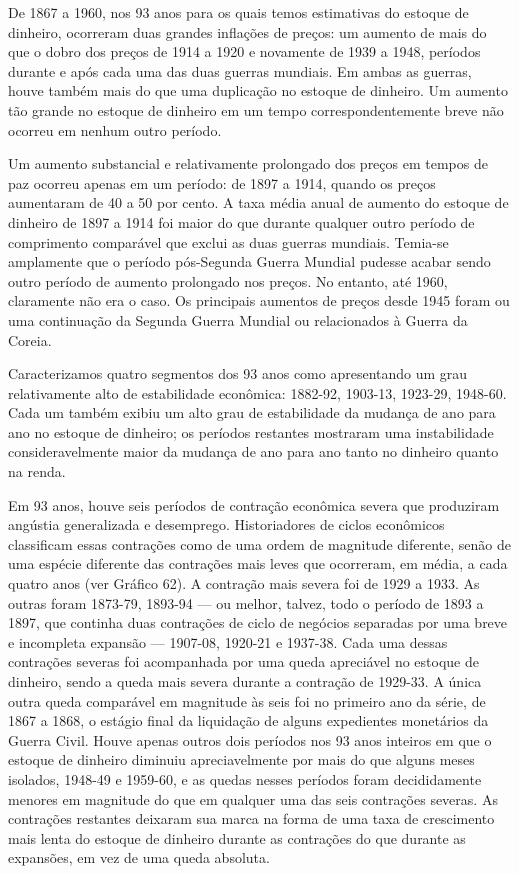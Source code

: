 \documentclass[12pt]{article}
\begin{document}
De 1867 a 1960, nos 93 anos para os quais temos estimativas do estoque de dinheiro, ocorreram duas grandes inflações de preços: um aumento de mais do que o dobro dos preços de 1914 a 1920 e novamente de 1939 a 1948, períodos durante e após cada uma das duas guerras mundiais. Em ambas as guerras, houve também mais do que uma duplicação no estoque de dinheiro. Um aumento tão grande no estoque de dinheiro em um tempo correspondentemente breve não ocorreu em nenhum outro período.

Um aumento substancial e relativamente prolongado dos preços em tempos de paz ocorreu apenas em um período: de 1897 a 1914, quando os preços aumentaram de 40 a 50 por cento. A taxa média anual de aumento do estoque de dinheiro de 1897 a 1914 foi maior do que durante qualquer outro período de comprimento comparável que exclui as duas guerras mundiais. Temia-se amplamente que o período pós-Segunda Guerra Mundial pudesse acabar sendo outro período de aumento prolongado nos preços. No entanto, até 1960, claramente não era o caso. Os principais aumentos de preços desde 1945 foram ou uma continuação da Segunda Guerra Mundial ou relacionados à Guerra da Coreia.

Caracterizamos quatro segmentos dos 93 anos como apresentando um grau relativamente alto de estabilidade econômica: 1882-92, 1903-13, 1923-29, 1948-60. Cada um também exibiu um alto grau de estabilidade da mudança de ano para ano no estoque de dinheiro; os períodos restantes mostraram uma instabilidade consideravelmente maior da mudança de ano para ano tanto no dinheiro quanto na renda.

Em 93 anos, houve seis períodos de contração econômica severa que produziram angústia generalizada e desemprego. Historiadores de ciclos econômicos classificam essas contrações como de uma ordem de magnitude diferente, senão de uma espécie diferente das contrações mais leves que ocorreram, em média, a cada quatro anos (ver Gráfico 62). A contração mais severa foi de 1929 a 1933. As outras foram 1873-79, 1893-94 — ou melhor, talvez, todo o período de 1893 a 1897, que continha duas contrações de ciclo de negócios separadas por uma breve e incompleta expansão — 1907-08, 1920-21 e 1937-38. Cada uma dessas contrações severas foi acompanhada por uma queda apreciável no estoque de dinheiro, sendo a queda mais severa durante a contração de 1929-33. A única outra queda comparável em magnitude às seis foi no primeiro ano da série, de 1867 a 1868, o estágio final da liquidação de alguns expedientes monetários da Guerra Civil. Houve apenas outros dois períodos nos 93 anos inteiros em que o estoque de dinheiro diminuiu apreciavelmente por mais do que alguns meses isolados, 1948-49 e 1959-60, e as quedas nesses períodos foram decididamente menores em magnitude do que em qualquer uma das seis contrações severas. As contrações restantes deixaram sua marca na forma de uma taxa de crescimento mais lenta do estoque de dinheiro durante as contrações do que durante as expansões, em vez de uma queda absoluta.
\end{document}
